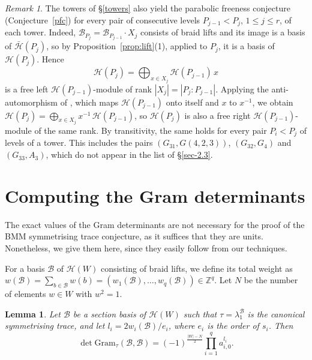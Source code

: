 \documentclass[11pt, reqno]{amsart}
\newcommand{\gram}{\mathrm{Gram}}
\newcommand{\cB}{\mathcal{B}}
\newcommand{\cH}{\mathcal{H}}
\newcommand{\bZ}{\mathbb{Z}}
\numberwithin{equation}{section}
\newtheorem{lemma}[theorem]{Lemma}
\theoremstyle{remark}
\newtheorem{remark}[theorem]{Remark}
\begin{document}
\begin{remark}\label{rem:parfree}
	The towers of \S \ref{towers} also yield the parabolic freeness conjecture
	(Conjecture~\ref{pfc}) for every pair of consecutive levels
	$P_{j-1}<P_j$, $1\le j\le r$, of each tower. Indeed,
	$\mathcal B_{P_j}=\mathcal B_{P_{j-1}}\cdot X_j$ consists of braid
	lifts and its image is a basis of $\bar{\mathcal H}(P_j)$, so by
	Proposition~\ref{prop:lift}(1), applied to $P_j$, it is a basis of
	$\mathcal H(P_j)$. Hence
	\[
	\mathcal H(P_j)=\bigoplus_{x\in X_j}\mathcal H(P_{j-1})\,x
	\]
	is a free left $\mathcal H(P_{j-1})$-module of rank
	$|X_j|=|P_j:P_{j-1}|$. Applying the anti-automorphism of \cite[Proposition~1.26]{BMM}, which
maps $\mathcal H(P_{j-1})$ onto itself and $x$ to $x^{-1}$, we obtain
$\mathcal H(P_j)=\bigoplus_{x\in X_j}x^{-1}\,\mathcal H(P_{j-1})$, so
$\mathcal H(P_j)$ is also a free right $\mathcal H(P_{j-1})$-module of
the same rank. By
	transitivity, the same holds for every pair $P_i<P_j$ of levels of a
	tower. This includes the pairs $(G_{31},G(4,2,3))$, $(G_{32},G_4)$
	and $(G_{33},A_3)$, which do not appear in the list of \S \ref{sec-2.3}.
\end{remark}


\appendix

\section{Computing the Gram determinants}

The exact values of the Gram determinants are not necessary for the proof of the BMM symmetrising trace conjecture, as it suffices that they are units. Nonetheless, we give them here, since they easily follow from our techniques.

For a basis $\cB$ of $\cH(W)$ consisting of braid lifts, we define its total weight as
$w(\cB)=\sum_{b\in\cB}w(b)=(w_1(\cB),\dots,w_q(\cB))\in\bZ^q$. Let $N$ be the number of elements $w\in W$ with
$w^2=1$.



\begin{lemma}\label{gramdet}
	Let $\cB$ be a section basis of $\cH(W)$ such that $\tau=\lambda_1^{\cB}$ is the canonical symmetrising trace,
	and let $l_i=2w_i(\cB)/e_i$, where $e_i$ is the order of $s_i$. Then
	\[
	\det\gram_{\tau}(\cB,\cB)=(-1)^{\frac{|W|-N}{2}}\prod_{i=1}^q a_{i,0}^{l_i}.
	\]
\end{lemma}
\end{document}
